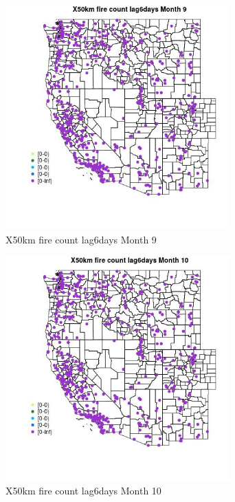 \begin{figure} 
\centering  
\includegraphics[width=0.77\textwidth]{Code_Outputs/Report_ML_input_PM25_Step4_part_e_de_duplicated_aves_compiled_2019-05-14wNAs_MapObsMo9X50km_fire_count_lag6days.jpg} 
\caption{\label{fig:Report_ML_input_PM25_Step4_part_e_de_duplicated_aves_compiled_2019-05-14wNAsMapObsMo9X50km_fire_count_lag6days}X50km fire count lag6days Month 9} 
\end{figure} 
 

\begin{figure} 
\centering  
\includegraphics[width=0.77\textwidth]{Code_Outputs/Report_ML_input_PM25_Step4_part_e_de_duplicated_aves_compiled_2019-05-14wNAs_MapObsMo10X50km_fire_count_lag6days.jpg} 
\caption{\label{fig:Report_ML_input_PM25_Step4_part_e_de_duplicated_aves_compiled_2019-05-14wNAsMapObsMo10X50km_fire_count_lag6days}X50km fire count lag6days Month 10} 
\end{figure} 
 

